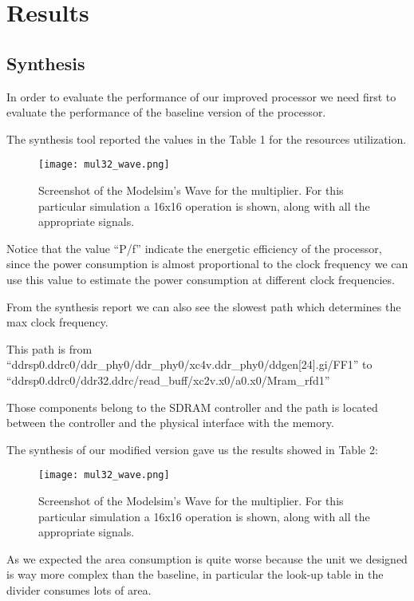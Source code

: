 \section{Results}

\subsection{Synthesis}

In order to evaluate the performance of our improved processor we need first to evaluate the
performance of the baseline version of the processor.

The synthesis tool reported the values in the Table 1 for the resources utilization.

\begin{figure}[H]
\centering
\texttt{[image: mul32\_wave.png]}
\caption{Screenshot of the Modelsim's Wave for the multiplier. For this particular simulation a 16x16 operation is shown, along with all the appropriate signals.}
\label{fig:mul32_wave}
\end{figure}

Notice that the value ``P/f'' indicate the energetic efficiency of the processor, since the power
consumption is almost proportional to the clock frequency we can use this value to estimate the
power consumption at different clock frequencies.

From the synthesis report we can also see the slowest path which determines the max clock
frequency.

This path is from ``ddrsp0.ddrc0/ddr\_phy0/ddr\_phy0/xc4v.ddr\_phy0/ddgen[24].gi/FF1'' to
``ddrsp0.ddrc0/ddr32.ddrc/read\_buff/xc2v.x0/a0.x0/Mram\_rfd1''

Those components belong to the SDRAM controller and the path is located between the controller
and the physical interface with the memory.

The synthesis of our modified version gave us the results showed in Table 2:


\begin{figure}[H]
\centering
\texttt{[image: mul32\_wave.png]}
\caption{Screenshot of the Modelsim's Wave for the multiplier. For this particular simulation a 16x16 operation is shown, along with all the appropriate signals.}
\label{fig:mul32_wave}
\end{figure}

As we expected the area consumption is quite worse because the unit we designed is way more
complex than the baseline, in particular the look-up table in the divider consumes lots of area.

